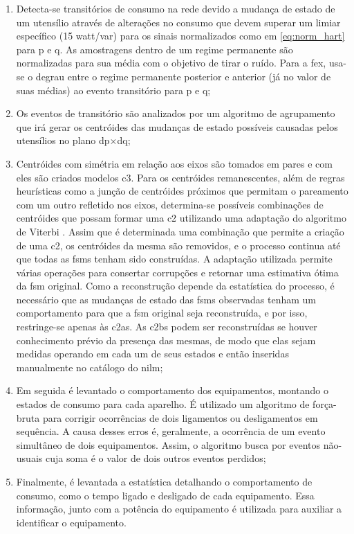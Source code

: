 \begin{enumerate}[label=\textbf{1.\arabic*},wide=\parindent]
\begin{enumerate}[label=\arabic*]
\item Detecta-se transitórios de consumo na rede devido a mudança de
estado de um utensílio através de alterações no consumo que devem
superar um limiar específico (15 \acrshort{watt}/\acrshort{var}) para os sinais
normalizados como em \ref{eq:norm_hart} para \acrshort{p} e \acrshort{q}.
As amostragens dentro de um regime permanente são normalizadas para
sua média com o objetivo de tirar o ruído. Para a \gls{fex}, usa-se o
degrau entre o regime permanente posterior e anterior (já no valor de
suas médias) ao evento transitório para \gls{p} e \gls{q};
\item Os eventos de transitório são analizados por um algoritmo de
agrupamento que irá gerar os centróides das mudanças de estado
possíveis causadas pelos utensílios no plano
\acrshort{dp}$\times$\acrshort{dq};
\item Centróides com simétria em relação aos eixos são tomados em
pares e com eles são criados modelos \gls{c3}. Para os centróides
remanescentes, além de regras heurísticas como a junção de centróides
próximos que permitam o pareamento com um outro refletido nos eixos,
determina-se possíveis combinações de centróides que possam formar uma
\gls{c2} utilizando uma adaptação do algoritmo de Viterbi
\cite{nilm_bouloutas_viterbi_ext_1991_11,
nilm_hart_fsm_viterbi_1993_12}. Assim que é determinada uma combinação
que permite a criação de uma \gls{c2}, os centróides da mesma são
removidos, e o processo continua até que todas as \glspl{fsm} tenham
sido construídas. A adaptação utilizada permite várias operações para
consertar corrupções e retornar uma estimativa ótima da \gls{fsm}
original. Como a reconstrução depende da estatística do processo, é
necessário que as mudanças de estado das \glspl{fsm} observadas tenham
um comportamento para que a \gls{fsm} original seja reconstruída, e
por isso, restringe-se apenas às \glspl{c2a}. As \glspl{c2b} podem ser
reconstruídas se houver conhecimento prévio da presença das mesmas, de
modo que elas sejam medidas operando em cada um de seus estados e
então inseridas manualmente no catálogo do \gls{nilm};
\item Em seguida é levantado o comportamento dos equipamentos,
montando o estados de consumo para cada aparelho. É utilizado um
algoritmo de força-bruta para corrigir ocorrências de dois ligamentos
ou desligamentos em sequência. A causa desses erros é, geralmente, a
ocorrência de um evento simultâneo de dois equipamentos. Assim, o
algoritmo busca por eventos não-usuais cuja soma é o valor de dois
outros eventos perdidos;
\item Finalmente, é levantada a estatística detalhando o
comportamento de consumo, como o tempo ligado e desligado de cada
equipamento. Essa informação, junto com a potência do equipamento é
utilizada para auxiliar a identificar o equipamento. 
\end{enumerate}


\end{enumerate}
